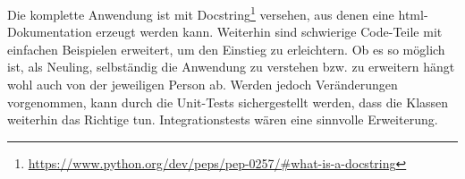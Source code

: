 Die komplette Anwendung ist mit Docstring\footnote{\url{https://www.python.org/dev/peps/pep-0257/\#what-is-a-docstring}} versehen, aus denen eine html-Dokumentation erzeugt werden kann. Weiterhin sind schwierige Code-Teile mit einfachen Beispielen erweitert, um den Einstieg zu erleichtern. Ob es so möglich ist, als Neuling, selbständig die Anwendung zu verstehen bzw. zu erweitern hängt wohl auch von der jeweiligen Person ab. Werden jedoch Veränderungen vorgenommen, kann durch die Unit-Tests sichergestellt werden, dass die Klassen weiterhin das Richtige tun. Integrationstests wären eine sinnvolle Erweiterung.